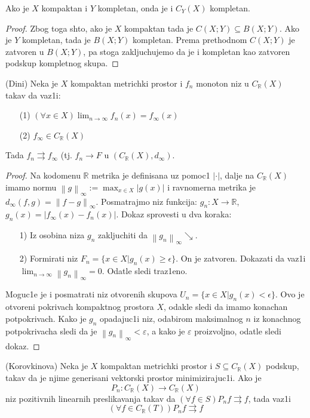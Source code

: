\documentclass[a4paper,12pt]{article}
\newcommand{\RR}{\mathbb{R}}
\newcommand{\eps}{\varepsilon}
\newcommand{\psj}{\subseteq}
\newcommand{\norm}[1]{\left\lVert#1\right\rVert}
\begin{document}
\begin{posl}
Ako je $X$ kompaktan i $Y$ kompletan, onda je i $C_Y(X)$ kompletan.
\end{posl}
\begin{proof}
Zbog toga shto, ako je $X$ kompaktan tada je $C(X;Y) \psj B(X;Y)$. Ako je $Y$ kompletan, tada je $B(X;Y)$ kompletan. Prema prethodnom $C(X;Y)$ je zatvoren u $B(X;Y)$, pa stoga zakljuchujemo da je i kompletan kao zatvoren podskup kompletnog skupa.
\end{proof}

\begin{tma}
(Dini) Neka je $X$ kompaktan metrichki prostor i $f_n$ monoton niz u $C_{\RR}(X)$ takav da vaz1i:
\begin{itemize}
\item[(1)] $(\forall x \in X) \lim_{n \to \infty} f_n(x) = f_{\infty}(x)$
\item[(2)] $f_{\infty} \in C_{\RR}(X)$
\end{itemize}
Tada $f_n \rightrightarrows f_{\infty}$ (tj. $f_n \to F$ u $(C_{\RR}(X), d_{\infty})$.
\end{tma}
\begin{proof}
Na kodomenu $\RR$ metrika je definisana uz pomoc1 $|\cdot |$, dalje na $C_{\RR}(X)$ imamo normu $\norm{g}_{\infty}:= \max_{x\in X}|g(x)|$ i ravnomerna metrika je $d_{\infty}(f,g) = \norm{f - g}_{\infty}$. Posmatrajmo niz funkcija: $g_n:X \to \RR$, $g_n(x) = |f_{\infty}(x) - f_n(x)|$. Dokaz sprovesti u dva koraka:
\begin{itemize}
\item[1)] Iz osobina niza $g_n$ zakljuchiti da $\norm{g_n}_{\infty} \searrow$.
\item[2)] Formirati niz $F_n = \{x \in X | g_n(x) \geq \epsilon \}$. On je zatvoren. Dokazati da vaz1i \\$\lim_{n \to \infty} \norm{g_n}_{\infty} = 0$. Odatle sledi traz1eno.
\end{itemize}

Moguc1e je i posmatrati niz otvorenih skupova $U_n = \{x \in X | g_n(x) < \epsilon \}$. Ovo je otvoreni pokrivach kompaktnog prostora $X$, odakle
	sledi da imamo konachan potpokrivach. Kako je $g_n$ opadajuc1i niz, odabirom maksimalnog $n$ iz konachnog potpokrivacha sledi da je $\norm{g_n}_\infty < \eps$,
	a kako je $\eps$ proizvoljno, odatle sledi dokaz.
\end{proof}

\begin{tma}
(Korovkinova) Neka je $X$ kompaktan metrichki prostor i $S \psj C_{\RR}(X)$ podskup, takav da je njime generisani vektorski prostor minimizirajuc1i. Ako je \[P_n: C_{\RR}(X) \to C_{\RR}(X)\]
 niz pozitivnih linearnih preslikavanja takav da $(\forall f \in S) P_n f \rightrightarrows f$, tada vaz1i
\[(\forall f \in C_{\RR}(T)) P_nf \rightrightarrows f \]
\end{tma}
\end{document}
